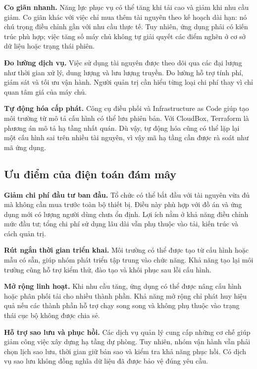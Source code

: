 \textbf{Co giãn nhanh.} Năng lực phục vụ có thể tăng khi tải cao và giảm khi nhu cầu giảm. Co giãn khác với việc chỉ mua thêm tài nguyên theo kế hoạch dài hạn: nó chú trọng điều chỉnh gần với nhu cầu thực tế. Tuy nhiên, ứng dụng phải có kiến trúc phù hợp; việc tăng số máy chủ không tự giải quyết các điểm nghẽn ở cơ sở dữ liệu hoặc trạng thái phiên.

\textbf{Đo lường dịch vụ.} Việc sử dụng tài nguyên được theo dõi qua các đại lượng như thời gian xử lý, dung lượng và lưu lượng truyền. Đo lường hỗ trợ tính phí, giám sát và tối ưu vận hành. Người quản trị cần hiểu từng loại chi phí thay vì chỉ quan tâm giá của máy chủ.

\textbf{Tự động hóa cấp phát.} Công cụ điều phối và Infrastructure as Code giúp tạo môi trường từ mô tả cấu hình có thể lưu phiên bản. Với CloudBox, Terraform là phương án mô tả hạ tầng nhất quán. Dù vậy, tự động hóa cũng có thể lặp lại một cấu hình sai trên nhiều tài nguyên, vì vậy mã hạ tầng cần được rà soát như mã ứng dụng.

\subsection{Ưu điểm của điện toán đám mây}
\textbf{Giảm chi phí đầu tư ban đầu.} Tổ chức có thể bắt đầu với tài nguyên vừa đủ mà không cần mua trước toàn bộ thiết bị. Điều này phù hợp với đồ án và ứng dụng mới có lượng người dùng chưa ổn định. Lợi ích nằm ở khả năng điều chỉnh mức đầu tư; tổng chi phí sử dụng lâu dài vẫn phụ thuộc vào tải, kiến trúc và cách quản trị.

\textbf{Rút ngắn thời gian triển khai.} Môi trường có thể được tạo từ cấu hình hoặc mẫu có sẵn, giúp nhóm phát triển tập trung vào chức năng. Khả năng tạo lại môi trường cũng hỗ trợ kiểm thử, đào tạo và khôi phục sau lỗi cấu hình.

\textbf{Mở rộng linh hoạt.} Khi nhu cầu tăng, ứng dụng có thể được nâng cấu hình hoặc phân phối tải cho nhiều thành phần. Khả năng mở rộng chỉ phát huy hiệu quả nếu các thành phần hỗ trợ chạy song song và không phụ thuộc vào trạng thái cục bộ không được chia sẻ.

\textbf{Hỗ trợ sao lưu và phục hồi.} Các dịch vụ quản lý cung cấp những cơ chế giúp giảm công việc xây dựng hạ tầng dự phòng. Tuy nhiên, nhóm vận hành vẫn phải chọn lịch sao lưu, thời gian giữ bản sao và kiểm tra khả năng phục hồi. Có dịch vụ sao lưu không đồng nghĩa dữ liệu đã được bảo vệ đúng yêu cầu.

